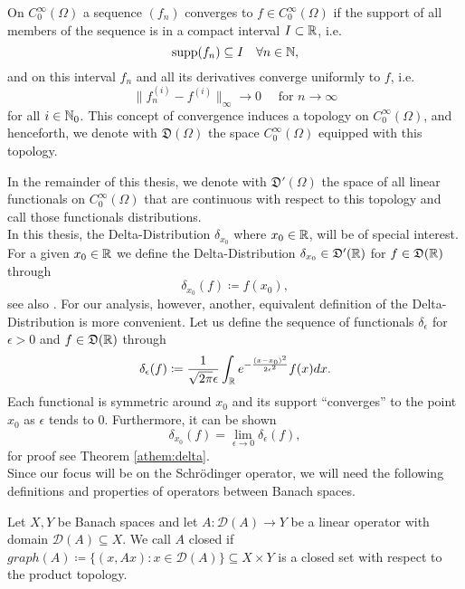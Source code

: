 \begin{definition}[Distributions]
	On $C_{0}^{\infty}(\Omega)$ a sequence $(f_{n})$ converges to $f \in C_{0}^{\infty}(\Omega)$ if the support of all members of the sequence is in a compact interval $I \subset \mathbb{R}$, i.e.
	$$ \operatorname{supp} (f_{n}) \subseteq I \quad \forall n \in \mathbb{N}, $$
	and on this interval $f_{n}$ and all its derivatives converge uniformly to $f$, i.e.
	\[ \| f_{n}^{(i)} - f^{(i)} \|_{\infty} \rightarrow 0 \quad \text{ for } n \rightarrow \infty \]
	for all $i \in \mathbb{N}_{0}$. This concept of convergence induces a topology on $C_{0}^{\infty}(\Omega)$, and henceforth, we denote with $\mathfrak{D}(\Omega)$ the space $C_{0}^{\infty}(\Omega)$ equipped with this topology.
\end{definition}

In the remainder of this thesis, we denote with $\mathfrak{D}'(\Omega)$ the space of all linear functionals on $C_{0}^{\infty}(\Omega)$ that are continuous with respect to this topology and call those functionals distributions.  
~\\

In this thesis, the Delta-Distribution $\delta_{x_{0}}$ where $x_{0} \in \mathbb{R}$, will be of special interest. For a given $x_{0} \in \mathbb{R}$ we define the Delta-Distribution $\delta_{x_{0}} \in \mathfrak{D}'(\mathbb{R})$ for $f \in \mathfrak{D}(\mathbb{R})$ through
		\[  \delta_{x_{0}}(f) \coloneqq f(x_{0}), \]
	see also \cite[p. 429]{werner2006funkana}. For our analysis, however, another, equivalent definition of the Delta-Distribution is more convenient. Let us define the sequence of functionals $\delta_{\epsilon}$ for $\epsilon > 0$ and $f \in \mathfrak{D}(\mathbb{R})$ through
	\begin{equation}
		\delta_{\epsilon}(f) \coloneqq \frac{1}{\sqrt{2 \pi} \epsilon} \int_{\mathbb{R}} e^{-\frac{(x - x_{0})^{2}}{2 \epsilon^{2}}} f(x) dx. \label{eq:2.1-smooth_potential}
	\end{equation}
 	Each functional is symmetric around $x_{0}$ and its support \enquote{converges} to the point $x_{0}$ as $\epsilon$ tends to $0$. Furthermore, it can be shown 
 	\[ \delta_{x_{0}}(f) = \lim_{\epsilon \rightarrow 0} \delta_{\epsilon}(f), \]
 	for proof see Theorem \ref{athem:delta}.
~\\

Since our focus will be on the Schrödinger operator, we will need the following definitions and properties of operators between Banach spaces.
\begin{definition} 
Let $X, Y$ be Banach spaces and let $A \colon \mathcal{D}(A) \rightarrow Y$ be a linear operator with domain $\mathcal{D}(A) \subseteq X$. We call $A$ closed if $graph(A) \coloneqq \{ (x, Ax) : x \in \mathcal{D}(A) \} \subseteq X \times Y$ is a closed set with respect to the product topology.
\end{definition}

